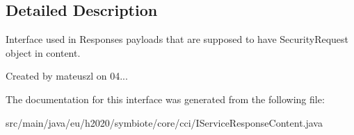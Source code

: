 \subsection{Detailed Description}
Interface used in Responses payloads that are supposed to have Security\+Request object in content.

Created by mateuszl on 04... 

The documentation for this interface was generated from the following file\+:\begin{DoxyCompactItemize}
\item 
src/main/java/eu/h2020/symbiote/core/cci/I\+Service\+Response\+Content.\+java\end{DoxyCompactItemize}
